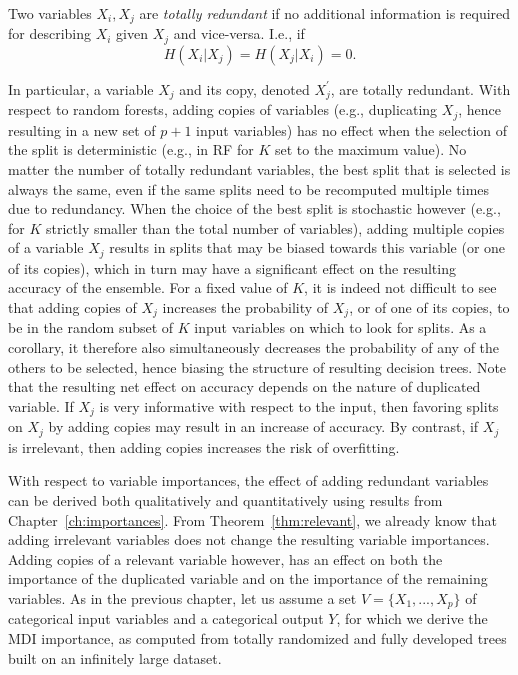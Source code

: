 \begin{definition}
Two variables $X_i, X_j$ are \emph{totally redundant} if no additional information
is required for describing $X_i$ given $X_j$ and vice-versa. I.e., if
\begin{equation}
H(X_i|X_j) = H(X_j|X_i) = 0.
\end{equation}
\end{definition}

In particular, a variable $X_j$ and its copy, denoted $X_j^\prime$, are totally
redundant. With respect to random forests, adding copies of variables (e.g.,
duplicating $X_j$, hence resulting in a new set of $p+1$ input variables) has
no effect when the selection of the split is deterministic (e.g., in RF for $K$
set to the maximum value). No matter the number of totally redundant variables,
the best split that is selected is always the same, even if the same splits
need to be recomputed multiple times due to redundancy. When the choice of the
best split is stochastic however (e.g., for $K$ strictly smaller than the total number
of variables), adding multiple copies of a variable $X_j$ results in
splits that may be biased towards this variable (or one of its copies), which
in turn may have a significant effect on the resulting accuracy of the
ensemble. For a fixed value of $K$, it is indeed not difficult to see that
adding copies of $X_j$ increases the probability of $X_j$, or of one of its
copies, to be in the random subset of $K$ input variables on which to look for
splits. As a corollary, it therefore also simultaneously decreases the
probability of any of the others to be selected, hence biasing
the structure of resulting decision trees. Note that the resulting net effect
on accuracy depends on the nature of duplicated variable. If $X_j$ is very
informative with respect to the input, then favoring splits on $X_j$ by
adding copies may result in an increase of accuracy. By contrast, if $X_j$
is irrelevant, then adding  copies increases the risk of overfitting.

With respect to variable importances, the effect of adding redundant variables
can be derived both qualitatively and quantitatively using results from
Chapter~\ref{ch:importances}. From Theorem~\ref{thm:relevant}, we already know
that adding irrelevant variables does not change the resulting variable
importances. Adding copies of a relevant variable however, has an effect on
both the importance of the duplicated variable and on the importance of the
remaining variables. As in the previous chapter, let us assume a set $V= \{X_1,
..., X_p\}$  of categorical input variables and a categorical output $Y$, for
which we derive the MDI importance, as computed from totally randomized and
fully developed trees built on an infinitely large dataset.

